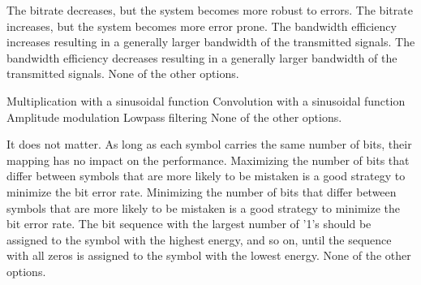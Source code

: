 \begin{checkboxes}
    \choice The bitrate decreases, but the system becomes more robust to errors.
    \CorrectChoice The bitrate increases, but the system becomes more error prone.
    \choice The bandwidth efficiency increases resulting in a generally larger bandwidth of the transmitted signals.
    \choice The bandwidth efficiency decreases resulting in a generally larger bandwidth of the transmitted signals.
    \choice None of the other options.
\end{checkboxes}

\begin{checkboxes}
    \CorrectChoice Multiplication with a sinusoidal function
    \choice Convolution with a sinusoidal function
    \choice Amplitude modulation
    \choice Lowpass filtering
    \choice None of the other options.
\end{checkboxes}

\begin{checkboxes}
    \choice It does not matter. As long as each symbol carries the same number of bits, their mapping has no impact on the performance.
    \choice Maximizing the number of bits that differ between symbols that are more likely to be mistaken is a good strategy to minimize the bit error rate.
    \CorrectChoice Minimizing the number of bits that differ between symbols that are more likely to be mistaken is a good strategy to minimize the bit error rate.
    \choice The bit sequence with the largest number of '1's should be assigned to the symbol with the highest energy, and so on, until the sequence with all zeros is assigned to the symbol with the lowest energy.
    \choice None of the other options.
\end{checkboxes}
